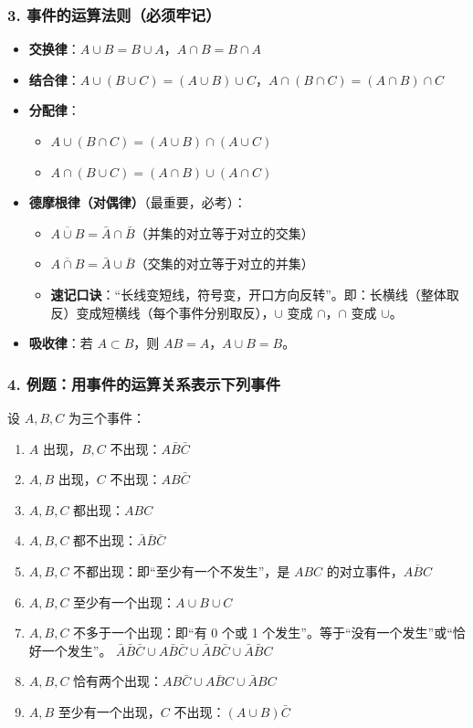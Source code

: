 \documentclass[12pt,a4paper]{ctexart}
\begin{document}
\subsubsection{3. 事件的运算法则（必须牢记）}
\begin{itemize}[noitemsep]
    \item \textbf{交换律}：$A\cup B = B\cup A$，$A\cap B = B\cap A$
    \item \textbf{结合律}：$A\cup (B\cup C) = (A\cup B)\cup C$，$A\cap (B\cap C) = (A\cap B)\cap C$
    \item \textbf{分配律}：
          \begin{itemize}[noitemsep]
              \item $A\cup (B\cap C) = (A\cup B)\cap (A\cup C)$
              \item $A\cap (B\cup C) = (A\cap B)\cup (A\cap C)$
          \end{itemize}
    \item \textbf{德摩根律（对偶律）}（最重要，必考）：
          \begin{itemize}[noitemsep]
              \item $\overline{A\cup B} = \bar{A}\cap \bar{B}$（并集的对立等于对立的交集）
              \item $\overline{A\cap B} = \bar{A}\cup \bar{B}$（交集的对立等于对立的并集）
              \item \textbf{速记口诀}：“长线变短线，符号变，开口方向反转”。即：长横线（整体取反）变成短横线（每个事件分别取反），$\cup$ 变成 $\cap$，$\cap$ 变成 $\cup$。
          \end{itemize}
    \item \textbf{吸收律}：若 $A\subset B$，则 $AB = A$，$A\cup B = B$。
\end{itemize}

\subsubsection{4. 例题：用事件的运算关系表示下列事件}
设 $A, B, C$ 为三个事件：
\begin{enumerate}[noitemsep]
    \item $A$ 出现，$B, C$ 不出现：$\boxed{A\bar{B}\bar{C}}$
    \item $A, B$ 出现，$C$ 不出现：$\boxed{AB\bar{C}}$
    \item $A, B, C$ 都出现：$\boxed{ABC}$
    \item $A, B, C$ 都不出现：$\boxed{\bar{A}\bar{B}\bar{C}}$
    \item $A, B, C$ 不都出现：即“至少有一个不发生”，是 $ABC$ 的对立事件，$\boxed{\overline{ABC}}$
    \item $A, B, C$ 至少有一个出现：$\boxed{A \cup B \cup C}$
    \item $A, B, C$ 不多于一个出现：即“有 0 个或 1 个发生”。等于“没有一个发生”或“恰好一个发生”。
          $\boxed{\bar{A}\bar{B}\bar{C} \cup A\bar{B}\bar{C} \cup \bar{A}B\bar{C} \cup \bar{A}\bar{B}C}$
    \item $A, B, C$ 恰有两个出现：$\boxed{AB\bar{C} \cup A\bar{B}C \cup \bar{A}BC}$
    \item $A, B$ 至少有一个出现，$C$ 不出现：$\boxed{(A\cup B)\bar{C}}$
\end{enumerate}
\end{document}
